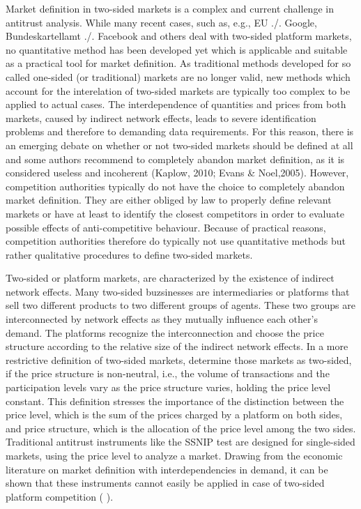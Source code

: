 \documentclass[12pt,a4paper,notitlepage]{article}
\begin{document}
Market definition in two-sided markets is a complex and current challenge in antitrust analysis. While many recent cases, such as, e.g., EU ./. Google, Bundeskartellamt ./. Facebook and others deal with two-sided platform markets, no quantitative method has been developed yet which is applicable and suitable as a practical tool for market definition. As traditional methods developed for so called one-sided (or traditional) markets are no longer valid, new methods which account for the interelation of two-sided markets are typically too complex to be applied to actual cases. The interdependence of quantities and prices from both markets, caused by indirect network effects, leads to severe identification problems and therefore to demanding data requirements. For this reason, there is an emerging debate on whether or not two-sided markets should be defined at all and some authors recommend to completely abandon market definition, as it is considered useless and incoherent (Kaplow, 2010; Evans \& Noel,2005). However, competition authorities typically do not have the choice to completely abandon market definition. They are either obliged by law to properly define relevant markets or have at least to identify the closest competitors in order to evaluate possible effects of anti-competitive behaviour. Because of practical reasons, competition authorities therefore do typically not use quantitative methods but rather qualitative procedures to define two-sided markets.   

Two-sided or platform markets, are characterized by the existence of indirect network effects. Many two-sided buzsinesses are intermediaries or platforms that sell two different products to two different groups of agents. These two groups are interconnected by network effects as they mutually influence each other’s demand. The platforms recognize the interconnection and choose the price structure according to the relative size of the indirect network effects. In a more restrictive definition of two-sided markets, \cite{rochet_platform_2003} determine those markets as two-sided, if the price structure is non-neutral, i.e., the volume of transactions and the participation levels vary as the price structure varies, holding the price level constant. This definition stresses the importance of the distinction between the price level, which is the sum of the prices charged by a platform on both sides, and price structure, which is the allocation of the price level among the two sides. Traditional antitrust instruments like the SSNIP test are designed for single-sided markets, using the price level to analyze a market. Drawing from the economic literature on market definition with interdependencies in demand, it can be shown that these instruments cannot easily be applied in case of two-sided platform competition (\cite{noel_analyzing_2005} \cite{filistrucchi_market_2013}).
\end{document}

